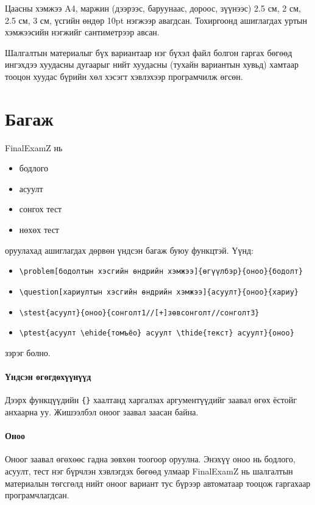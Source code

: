 \documentclass[10pt]{article}
\theoremstyle{definition}
\begin{document}
\par Цаасны хэмжээ A4, маржин (дээрээс, баруунаас, дороос, зүүнээс) 2.5 см, 2 см, 2.5 см, 3 см, үсгийн өндөр 10pt нэгжээр авагдсан. Тохиргоонд ашиглагдах уртын хэмжээсийн нэгжийг сантиметрээр авсан.

\par Шалгалтын материалыг бүх вариантаар нэг бүхэл файл болгон гаргах бөгөөд ингэхдээ хуудасны дугаарыг нийт хуудасны (тухайн вариантын хувьд) хамтаар тооцон хуудас бүрийн хөл хэсэгт хэвлэхээр програмчилж өгсөн.

\section{Багаж}\label{tools}

FinalExamZ нь
\begin{itemize}
 \item бодлого
 \item асуулт
 \item сонгох тест
 \item нөхөх тест
\end{itemize}
оруулахад ашиглагдах дөрвөн үндсэн багаж буюу функцтэй. Үүнд:
\begin{itemize}
 \item \verb|\problem[бодолтын хэсгийн өндрийн хэмжээ]{өгүүлбэр}{оноо}{бодолт}|
 \item \verb|\question[хариултын хэсгийн өндрийн хэмжээ]{асуулт}{оноо}{хариу}|
 \item \verb|\stest{асуулт}{оноо}{сонголт1//[+]зөвсонголт//сонголт3}|
 \item \verb|\ptest{асуулт \ehide{томъёо} асуулт \thide{текст} асуулт}{оноо}|
\end{itemize}
зэрэг болно. 

\paragraph{Үндсэн өгөгдөхүүнүүд} Дээрх функцүүдийн \texttt{\{\}} хаалтанд харгалзах аргументүүдийг заавал өгөх ёстойг анхаарна уу. Жишээлбэл оноог заавал заасан байна. 

\paragraph{Оноо} Оноог заавал өгөхөөс гадна зөвхөн тоогоор оруулна. Энэхүү оноо нь бодлого, асуулт, тест нэг бүрчлэн хэвлэгдэх бөгөөд улмаар FinalExamZ нь шалгалтын материалын төгсгөлд нийт оноог вариант тус бүрээр автоматаар тооцож гаргахаар програмчлагдсан.
\end{document}
